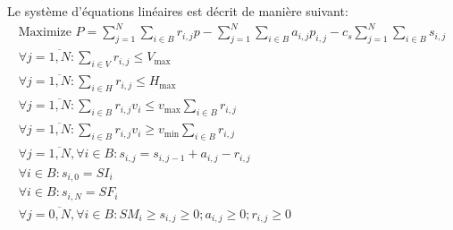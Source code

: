 \documentclass[10pt,a4paper]{article}
\begin{document}
Le système d'équations linéaires est décrit de manière suivant:
\begin{align*}
    \text{Maximize } P = \sum\limits_{j = 1}^N {\sum\limits_{i \in B}^{} {{r_{i,j}}p} }  - \sum\limits_{j = 1}^N {\sum\limits_{i \in B}^{} {{a_{i,j}}{p_{i,j}}} }  - {c_s}\sum\limits_{j = 1}^N {\sum\limits_{i \in B}^{} {{s_{i,j}}} }\\
        \forall j = \overline {1,N} :\sum\limits_{i \in V}^{} {{r_{i,j}}}  \le {V_{\max }}\\
        \forall j = \overline {1,N} :\sum\limits_{i \in H}^{} {{r_{i,j}}}  \le {H_{\max }}\\
        \forall j = \overline {1,N} :\sum\limits_{i \in B}^{} {{r_{i,j}}{v_i}}  \le {v_{\max }}\sum\limits_{i \in B}^{} {{r_{i,j}}} \\
        \forall j = \overline {1,N} :\sum\limits_{i \in B}^{} {{r_{i,j}}{v_i}}  \ge {v_{\min }}\sum\limits_{i \in B}^{} {{r_{i,j}}} \\
        \forall j = \overline {1,N} ,\forall i \in B:{s_{i,j}} = {s_{i,j - 1}} + {a_{i,j}} - {r_{i,j}}\\
        \forall i \in B:{s_{i,0}} = S{I_i}\\
        \forall i \in B:{s_{i,N}} = S{F_i}\\
        \forall j = \overline {0,N} ,\forall i \in B:S{M_i} \ge {s_{i,j}} \ge 0;{a_{i,j}} \ge 0;{r_{i,j}} \ge 0
\end{align*}
\end{document}
